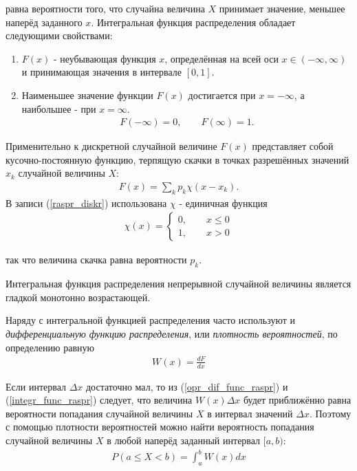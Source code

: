 равна вероятности того, что случайна величина $X$ принимает значение, меньшее наперёд заданного $x$. Интегральная функция распределения обладает следующими свойствами:
\begin{enumerate}
	\item $F(x)$ - неубывающая функция $x$, определённая на всей оси $x\in(-\infty,\infty)$ и принимающая значения в интервале $[0, 1]$.
	\item {Наименьшее значение функции $F(x)$ достигается при $x = -\infty$, а наибольшее - при $x = \infty$.
	\begin{align}
		F(-\infty)=0, \qquad F(\infty) = 1.
	\end{align}
	}
\end{enumerate}

Применительно к дискретной случайной величине $F(x)$ представляет собой кусочно-постоянную функцию, терпящую скачки в точках разрешённых значений $x_k$ случайной величины $X$:
\begin{align} \label{raspr_diskr}
	F(x) = \sum_{k}{p_k \chi (x - x_k).}
\end{align}
В записи (\ref{raspr_diskr}) использована $\chi$ - единичная функция 
\begin{align}
	\chi(x) = \left \{
	\begin{aligned}
		0, \qquad x \leq 0 \\
		1, \qquad x > 0
	\end{aligned} \right.
\end{align}

так что величина скачка равна вероятности $p_k$.

Интегральная функция распределения непрерывной случайной величины является гладкой монотонно возрастающей.

Наряду с интегральной функцией распределения часто используют и \textit{дифференциальную функцию распределения}, или \textit{плотность вероятностей}, по определению равную 
\begin{align} \label{opr_dif_func_raspr}
	W(x) = \frac{dF}{dx}
\end{align}

 Если интервал $\Delta x$ достаточно мал, то из (\ref{opr_dif_func_raspr}) и (\ref{integr_func_raspr})  следует, что величина $W(x)\Delta x$ будет приближённо равна вероятности попадания случайной величины $X$ в интервал значений $\Delta x$. Поэтому с помощью плотности вероятностей можно найти вероятность попадания случайной величины $X$ в любой наперёд заданный интервал $[a, b)$:
 \begin{align}
 	P(a \leq X < b) = \int_{a}^{b}{W(x)dx}
 \end{align}
 
